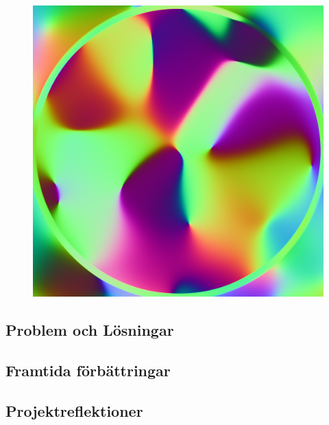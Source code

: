 \documentclass[a4paper]{article}
\begin{document}
\begin{figure}[H]
\begin{minipage}[]{0.19\textwidth}
\end{minipage}
\begin{minipage}[]{0.19\textwidth}
\includegraphics[width=\textwidth]{share/Curl.png}
\end{minipage}
\end{figure}

        \subsection{Problem och Lösningar}

        \subsection{Framtida förbättringar}

        \subsection{Projektreflektioner}

    \nocite{*} %
    
    
\end{document}
